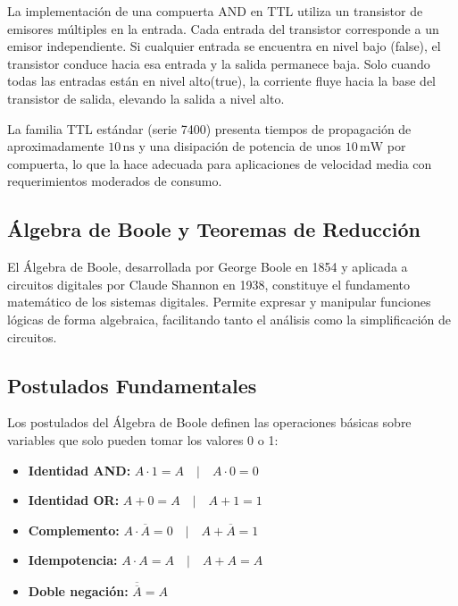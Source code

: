 \documentclass[12pt,letterpaper]{article}
\newcommand{\boolnot}[1]{\ensuremath{\overline{#1}}}
\begin{document}
    La implementación de una compuerta AND en TTL utiliza un transistor de emisores
    múltiples en la entrada. Cada entrada del transistor corresponde a un emisor
    independiente. Si cualquier entrada se encuentra en nivel bajo (false), el transistor conduce
    hacia esa entrada y la salida permanece baja. Solo cuando todas las entradas están en
    nivel alto(true), la corriente fluye hacia la base del transistor de salida, elevando la salida
    a nivel alto.
    
    La familia TTL estándar (serie 7400) presenta tiempos de propagación de aproximadamente
    $10\,\text{ns}$ y una disipación de potencia de unos $10\,\text{mW}$ por compuerta,
    lo que la hace adecuada para aplicaciones de velocidad media con requerimientos moderados
    de consumo.
    \subsection{Álgebra de Boole y Teoremas de Reducción}
    
    El Álgebra de Boole, desarrollada por George Boole en 1854 y aplicada a circuitos
    digitales por Claude Shannon en 1938, constituye el fundamento matemático de los sistemas
    digitales. Permite expresar y manipular funciones lógicas de forma algebraica, facilitando
    tanto el análisis como la simplificación de circuitos.
    
    \subsection{Postulados Fundamentales}
    
    Los postulados del Álgebra de Boole definen las operaciones básicas sobre variables que
    solo pueden tomar los valores 0 o 1:
    
    \begin{itemize}[leftmargin=1.5cm]
    \item \textbf{Identidad AND:} $A \cdot 1 = A \quad|\quad A \cdot 0 = 0$
    \item \textbf{Identidad OR:}  $A + 0 = A \quad|\quad A + 1 = 1$
    \item \textbf{Complemento:}   $A \cdot \boolnot{A} = 0 \quad|\quad A + \boolnot{A} = 1$
    \item \textbf{Idempotencia:}  $A \cdot A = A \quad|\quad A + A = A$
    \item \textbf{Doble negación:} $\boolnot{\boolnot{A}} = A$
    \end{itemize}
    \newpage
    
\end{document}
